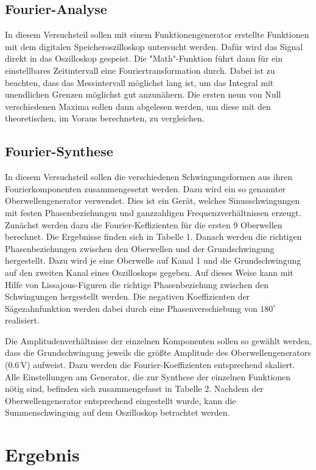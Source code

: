 \documentclass[11pt,ngerman,a4paper]{article}
\begin{document}
\subsection{Fourier-Analyse}

In diesem Versuchsteil sollen mit einem Funktionengenerator erstellte Funktionen mit dem digitalen Speicheroszilloskop untersucht werden. Dafür wird das Signal direkt in das Oszilloskop gespeist. Die "Math"-Funktion führt dann für ein einstellbares Zeitintervall eine Fouriertransformation durch. Dabei ist zu beachten, dass das Messintervall möglichst lang ist, um das Integral mit unendlichen Grenzen möglichst gut anzunähern. Die ersten neun von Null verschiedenen Maxima sollen dann abgelesen werden, um diese mit den theoretischen, im Voraus berechneten, zu vergleichen.

\subsection{Fourier-Synthese}

In diesem Versuchsteil sollen die verschiedenen Schwingungsformen aus ihren Fourierkomponenten zusammengesetzt werden. Dazu wird ein so genannter Oberwellengenerator verwendet. Dies ist ein Ger\"at, welches Sinusschwingungen mit festen Phasenbeziehungen und ganzzahligen Frequenzverh\"altnissen erzeugt. Zun\"achst werden dazu die Fourier-Keffizienten f\"ur die ersten 9 Oberwellen berechnet. Die Ergebnisse finden sich in Tabelle 1. Danach werden die richtigen Phasenbeziehungen zwischen den Oberwellen und der Grundschwingung hergestellt. Dazu wird je eine Oberwelle auf Kanal 1 und die Grundschwingung auf den zweiten Kanal eines Oszilloskops gegeben. Auf dieses Weise kann mit Hilfe von Lissajous-Figuren die richtige Phasenbeziehung zwischen den Schwingungen hergestellt werden. Die negativen Koeffizienten der S\"agezahnfunktion werden dabei durch eine Phasenverschiebung von $180 ^\circ$ realisiert. 

\noindent
Die Amplitudenverh\"altnisse der einzelnen Komponenten sollen so gew\"ahlt werden, dass die Grundschwingung jeweils die gr\"o\ss te Amplitude des Oberwellengenerators ($0.6\,$V) aufweist. Dazu werden die Fourier-Koeffizienten entsprechend skaliert. Alle Einstellungen am Generator, die zur Synthese der einzelnen Funktionen n\"otig sind, befinden sich zusammengefasst in Tabelle 2. Nachdem der Oberwellengenerator entsprechend eingestellt wurde, kann die Summenschwingung auf dem Oszilloskop betrachtet werden.
\section{Ergebnis}
\end{document}
